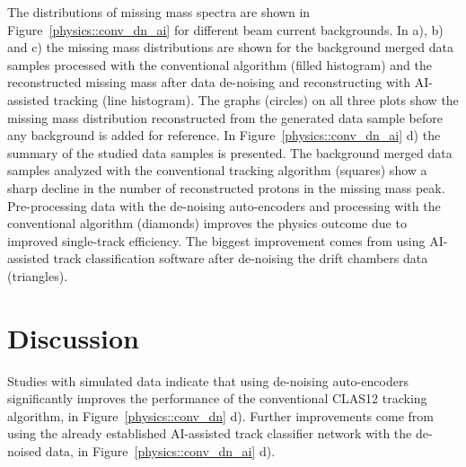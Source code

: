 The distributions of missing mass spectra are shown in Figure~\ref{physics::conv_dn_ai} for different beam current backgrounds.
In a), b) and c) the missing mass distributions are shown for the background merged data samples processed with the conventional algorithm 
(filled histogram) and the reconstructed missing mass after data de-noising and reconstructing with AI-assisted tracking (line histogram).
The graphs (circles) on all three plots show the missing mass distribution reconstructed from the generated data sample 
before any background is added for reference. In Figure~\ref{physics::conv_dn_ai} d) the summary of the studied data samples 
is presented. The background merged data samples analyzed with the conventional tracking algorithm (squares) show a sharp decline in
the number of reconstructed protons in the missing mass peak. Pre-processing data with the de-noising auto-encoders and processing
with the conventional algorithm (diamonds) improves the physics outcome due to improved single-track efficiency. The biggest improvement
comes from using AI-assisted track classification software after de-noising the drift chambers data (triangles). 


\section{Discussion}

Studies with simulated data indicate that using de-noising auto-encoders significantly improves the performance
of the conventional CLAS12 tracking algorithm, in Figure~\ref{physics::conv_dn} d). Further improvements come from using
the already established AI-assisted track classifier network with the de-noised data, in Figure~\ref{physics::conv_dn_ai} d).

